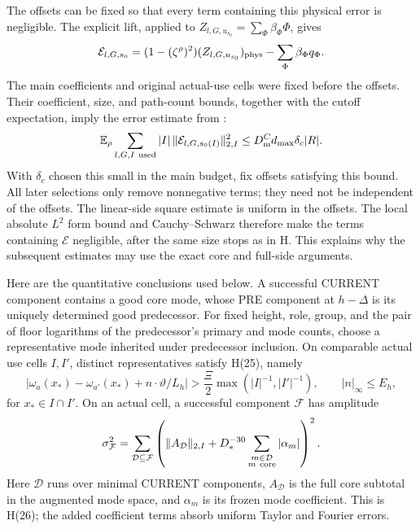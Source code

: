 The offsets can be fixed so that every term containing this physical
error is negligible.  The explicit lift, applied to
\(Z_{l,G,u_{s_0}}=\sum_\Phi\beta_\Phi\Phi\), gives
\[
 \mathcal E_{l,G,s_0}
   =(1-(\zeta^\rho)^2)(Z_{l,G,u_{s_0}})_{\rm phys}
                   -\sum_\Phi\beta_\Phi q_\Phi.
\]
The main coefficients and original actual-use cells were fixed before
the offsets.  Their coefficient, size, and path-count bounds, together
with the cutoff expectation, imply the error estimate from
\cite[Section~8, subsection on fixing offsets]{H}:
\[
 \mathbb E_\rho
 \sum_{l,G,I\ {\rm used}}|I|\,
       \|\mathcal E_{l,G,s_0(I)}\|_{2,I}^2
       \le D_{\rm m}^C d_{\max}\delta_c|R|.
\]
With \(\delta_c\) chosen this small in the main budget, fix offsets
satisfying this bound.  All later selections only remove nonnegative
terms; they need not be independent of the offsets.
The linear-side square estimate is uniform in the offsets.
The local absolute \(L^2\) form bound and Cauchy--Schwarz therefore
make the terms containing \(\mathcal E\) negligible, after the same
size stops as in H.  This explains why the subsequent estimates may
use the exact core and full-side arguments.

Here are the quantitative conclusions used below.  A successful
CURRENT component contains a good core mode, whose PRE component
at \(h-\Delta\) is its uniquely determined good predecessor.
For fixed height, role, group, and the pair of floor logarithms of
the predecessor's primary and mode counts, choose a representative
mode inherited under predecessor inclusion.  On comparable actual
use cells \(I,I'\), distinct representatives satisfy H(25), namely
\begin{equation}\label{eq:representative-separation-b}
 |\omega_a(x_*)-\omega_{a'}(x_*)+n\cdot\vartheta/L_h|
 >\frac\Xi2\max(|I|^{-1},|I'|^{-1}),
 \qquad |n|_\infty\le E_h,
\end{equation}
for \(x_*\in I\cap I'\).  On an actual cell, a successful component
\(\mathcal F\) has amplitude
\[
 \sigma_{\mathcal F}^2
  =\sum_{\mathcal D\subseteq\mathcal F}
   \left(\|A_{\mathcal D}\|_{2,I}
       +D_*^{-30}\sum_{\substack{m\in\mathcal D\\m\ {\rm core}}}
                         |\alpha_m|\right)^2 .
\]
Here \(\mathcal D\) runs over minimal CURRENT components,
\(A_{\mathcal D}\) is the full core subtotal in the augmented mode
space, and \(\alpha_m\) is its frozen mode coefficient.
This is H(26); the added coefficient terms absorb uniform Taylor
and Fourier errors.

